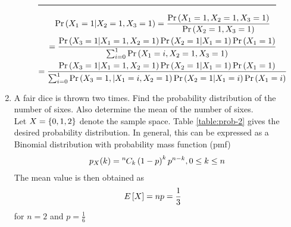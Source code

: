 \documentclass[journal,12pt,twocolumn]{IEEEtran}
\renewcommand\thesection{\arabic{section}}
\begin{document}
\begin{enumerate}[label=\thesection.\arabic*.,ref=\thesection.\theenumi]
		\begin{figure*}[!b]
			\hrule
		\begin{multline}
			\Pr\left(X_1 = 1|X_2 = 1, X_3=1\right) 
			= \frac{\Pr\left(X_1 = 1,X_2 = 1, X_3=1\right)}{\Pr\left(X_2 = 1, X_3=1\right)}
			\\
			= \frac{\Pr\left(X_3 = 1 | X_1 = 1, X_2=1\right)\Pr\left(X_2 = 1| X_1 = 1\right)\Pr\left(X_1=1\right)}{\sum_{i=0}^{1}\Pr\left(X_1 = i, X_2 = 1, X_3=1\right)}
			\\
			= \frac{\Pr\left(X_3 = 1 | X_1 = 1, X_2=1\right)\Pr\left(X_2 = 1| X_1 = 1\right)\Pr\left(X_1=1\right)}{\sum_{i=0}^{1}\Pr\left(X_3=1,| X_1 = i, X_2 = 1 \right)\Pr\left(X_2 = 1| X_1 = i\right)\Pr\left(X_1=i\right)}
			\label{eq:prob-1}
		\end{multline}
		\end{figure*}
\item A fair dice is thrown two times. Find the probability distribution of the number of sixes. Also determine the mean of the number of sixes.\\
	\solution Let $X = \left\{0,1,2\right\}$ denote the sample space.  
		Table 
	\eqref{table:prob-2}
		gives the desired probability distribution.  In general, this can be expressed as a Binomial distribution with probability mass function (pmf)
		\begin{align}
			p_X(k) = {{}^{n}\mkern-1muC_{k}}\left(1-p\right)^{k}p^{n-k}, 0 \le k \le n
		\end{align}
		The mean value is then obtained as
		\begin{align}
			E\left[ X \right] &= np = \frac{1}{3}
		\end{align}
		for $n = 2$ and $p = \frac{1}{6}$
\begin{table}[!htb]
	
\caption{}
	\label{table:prob-2}
\end{table}
\end{enumerate}
\end{document}
